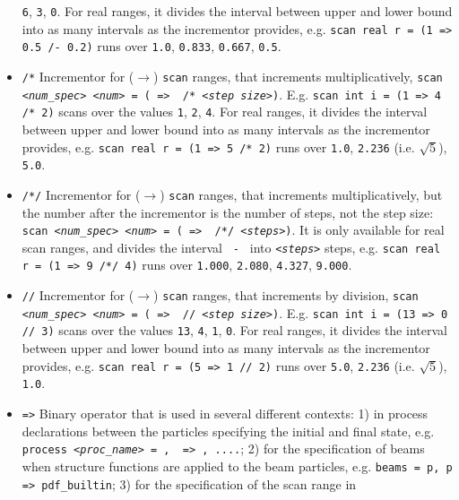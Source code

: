 \documentclass[12pt]{book}
\newcommand{\ttt}[1]{\texttt{#1}}
\begin{document}
\begin{itemize}
\ttt{6}, \ttt{3}, \ttt{0}. For real ranges, it divides the interval
between upper and lower bound into as many intervals as the incrementor
provides, e.g. \ttt{scan real r = (1 => 0.5 /- 0.2)} runs over 
\ttt{1.0}, \ttt{0.833}, \ttt{0.667}, \ttt{0.5}. 
\item
\ttt{/*} \newline
Incrementor for ($\to$) \ttt{scan} ranges, that increments multiplicatively,
\ttt{scan {\em <num\_spec>} {\em <num>} = ({\em <lower val>} => {\em <upper val>} /* {\em <step
size>})}. E.g. \ttt{scan int i = (1 => 4 /* 2)} scans over the values \ttt{1}, 
\ttt{2}, \ttt{4}. For real ranges, it divides the interval
between upper and lower bound into as many intervals as the incrementor
provides, e.g. \ttt{scan real r = (1 => 5 /* 2)} runs over 
\ttt{1.0}, \ttt{2.236} (i.e. $\sqrt{5}$), \ttt{5.0}. 
\item
\ttt{/*/} \newline
Incrementor for ($\to$) \ttt{scan} ranges, that increments multiplicatively, 
but the number after the incrementor is the number of steps, not the
step size: \ttt{scan {\em <num\_spec>} {\em <num>} = ({\em <lower val>} => {\em <upper val>}
/*/ {\em <steps>})}. It is only available for real scan ranges, and divides
the interval \ttt{{\em <upper val>} - {\em <lower val>}} into \ttt{{\em <steps>}} steps,
e.g. \ttt{scan real r = (1 => 9 /*/ 4)} runs over \ttt{1.000},
\ttt{2.080}, \ttt{4.327}, \ttt{9.000}.
\item
\ttt{//} \newline
Incrementor for ($\to$) \ttt{scan} ranges, that increments by division,
\ttt{scan {\em <num\_spec>} {\em <num>} = ({\em <lower val>} => {\em <upper val>} // {\em <step
size>})}. E.g. \ttt{scan int i = (13 => 0 // 3)} scans over the values \ttt{13}, 
\ttt{4}, \ttt{1}, \ttt{0}. For real ranges, it divides the interval
between upper and lower bound into as many intervals as the incrementor
provides, e.g. \ttt{scan real r = (5 => 1 // 2)} runs over 
\ttt{5.0}, \ttt{2.236} (i.e. $\sqrt{5}$), \ttt{1.0}. 
\item
\ttt{=>} \newline
Binary operator that is used in several different contexts: 1) in
process declarations between the particles specifying the 
initial and final state, e.g. \ttt{process {\em <proc\_name>} = {\em <in1>}, {\em <in2>}
=> {\em <out1>}, ....}; 2) for the specification of beams when
structure functions are applied to the beam particles, e.g. \ttt{beams
= p, p => pdf\_builtin}; 3) for the specification of the scan range in

\end{itemize}
\end{document}
